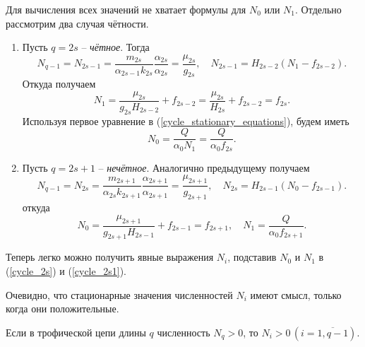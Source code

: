         Для вычисления всех значений не хватает формулы для \(N_0\) или \(N_1\). Отдельно рассмотрим два случая чётности.
        \begin{enumerate}
            \item Пусть \(q = 2s\) -- \textit{чётное}. Тогда
            \begin{equation*}
                N_{q-1} = N_{2s-1} = \frac{m_{2s}}{\alpha_{2s-1} k_{2s}} \frac{\alpha_{2s}}{\alpha_{2s}} = \frac{\mu_{2s}}{g_{2s}}, \quad N_{2s-1} = H_{2s-2} (N_1 - f_{2s-2}).
            \end{equation*}
            Откуда получаем
            \begin{equation*}
                N_1 = \frac{\mu_{2s}}{g_{2s} H_{2s-2}} + f_{2s-2} = \frac{\mu_{2s}}{H_{2s}} + f_{2s-2} = f_{2s}.
            \end{equation*}
            Используя первое уравнение в (\ref{cycle_stationary_equations}), будем иметь
            \begin{equation*}
                N_0 = \frac{Q}{\alpha_0 N_1} = \frac{Q}{\alpha_0 f_{2s}}.
            \end{equation*}

            \item Пусть \(q = 2s+1\) -- \textit{нечётное}. Аналогично предыдущему получаем
            \begin{equation*}
                N_{q-1} = N_{2s} = \frac{m_{2s+1}}{\alpha_{2s} k_{2s+1}} \frac{\alpha_{2s+1}}{\alpha_{2s+1}} = \frac{\mu_{2s+1}}{g_{2s+1}}, \quad N_{2s} = H_{2s-1} (N_0 - f_{2s-1}).
            \end{equation*} 
            откуда
            \begin{equation*}
                N_0 = \frac{\mu_{2s+1}}{g_{2s+1} H_{2s-1}} + f_{2s-1} = f_{2s+1}, \quad N_1 = \frac{Q}{\alpha_0 f_{2s+1}}.
            \end{equation*}
        \end{enumerate}

        Теперь легко можно получить явные выражения \(N_i\), подставив \(N_0\) и \( N_1\) в (\ref{cycle_2s}) и (\ref{cycle_2s1}).

        Очевидно, что стационарные значения численностей \(N_i\) имеют смысл, только когда они положительные.

        \begin{statement}
            Если в трофической цепи длины \(q\) численность \(N_q > 0\), то \(N_i > 0 \, (i=\overline{1,q-1})\).
        \end{statement}


